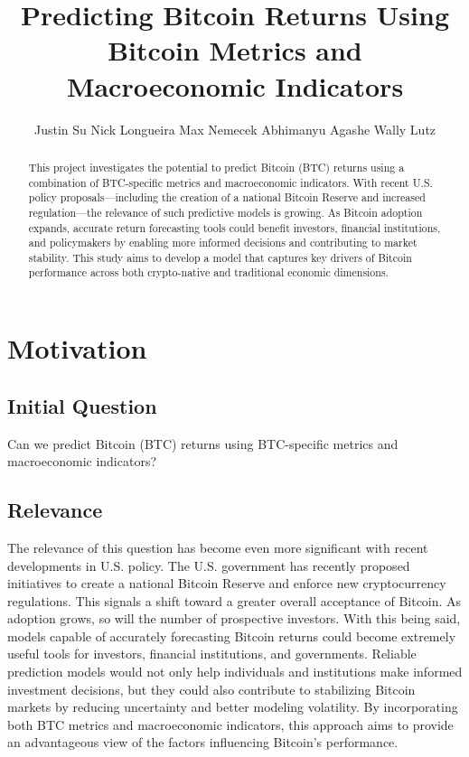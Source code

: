 \documentclass{article}
\title{Predicting Bitcoin Returns Using Bitcoin Metrics and Macroeconomic Indicators
}
\author{
Justin Su 
\And Nick Longueira 
\And Max Nemecek 
\And Abhimanyu Agashe 
\And Wally Lutz
}
\begin{document}
\maketitle

\begin{abstract}
   This project investigates the potential to predict Bitcoin (BTC) returns using a combination of BTC-specific metrics and macroeconomic indicators. With recent U.S. policy proposals—including the creation of a national Bitcoin Reserve and increased regulation—the relevance of such predictive models is growing. As Bitcoin adoption expands, accurate return forecasting tools could benefit investors, financial institutions, and policymakers by enabling more informed decisions and contributing to market stability. This study aims to develop a model that captures key drivers of Bitcoin performance across both crypto-native and traditional economic dimensions.
\end{abstract}


\section{Motivation}


\subsection{Initial Question}

Can we predict Bitcoin (BTC) returns using BTC-specific metrics and macroeconomic indicators?

\subsection{Relevance}

The relevance of this question has become even more significant with recent developments in U.S. policy. The U.S. government has recently proposed initiatives to create a national Bitcoin Reserve and enforce new cryptocurrency regulations. This signals a shift toward a greater overall acceptance of Bitcoin. As adoption grows, so will the number of prospective investors. With this being said, models capable of accurately forecasting Bitcoin returns could become extremely useful tools for investors, financial institutions, and governments. Reliable prediction models would not only help individuals and institutions make informed investment decisions, but they could also contribute to stabilizing Bitcoin markets by reducing uncertainty and better modeling volatility. By incorporating both BTC metrics and macroeconomic indicators, this approach aims to provide an advantageous view of the factors influencing Bitcoin’s performance.
\end{document}
